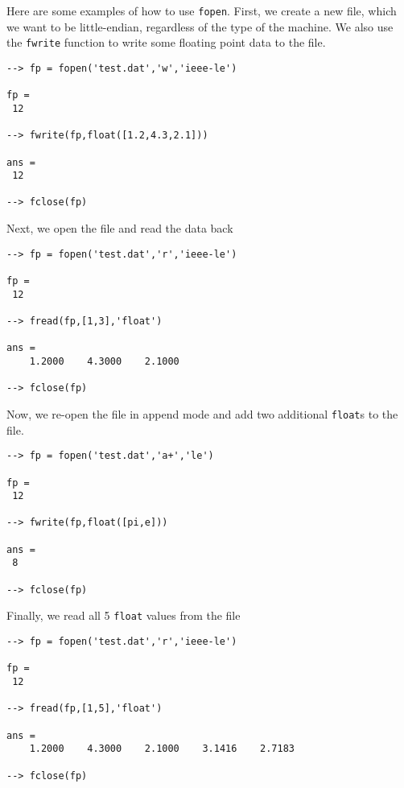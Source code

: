 Here are some examples of how to use \verb|fopen|.  First, we create a new 
file, which we want to be little-endian, regardless of the type of the machine.
We also use the \verb|fwrite| function to write some floating point data to
the file.
\begin{verbatim}
--> fp = fopen('test.dat','w','ieee-le')

fp = 
 12 

--> fwrite(fp,float([1.2,4.3,2.1]))

ans = 
 12 

--> fclose(fp)
\end{verbatim}
Next, we open the file and read the data back
\begin{verbatim}
--> fp = fopen('test.dat','r','ieee-le')

fp = 
 12 

--> fread(fp,[1,3],'float')

ans = 
    1.2000    4.3000    2.1000 

--> fclose(fp)
\end{verbatim}
Now, we re-open the file in append mode and add two additional \verb|float|s to the
file.
\begin{verbatim}
--> fp = fopen('test.dat','a+','le')

fp = 
 12 

--> fwrite(fp,float([pi,e]))

ans = 
 8 

--> fclose(fp)
\end{verbatim}
Finally, we read all 5 \verb|float| values from the file
\begin{verbatim}
--> fp = fopen('test.dat','r','ieee-le')

fp = 
 12 

--> fread(fp,[1,5],'float')

ans = 
    1.2000    4.3000    2.1000    3.1416    2.7183 

--> fclose(fp)
\end{verbatim}

